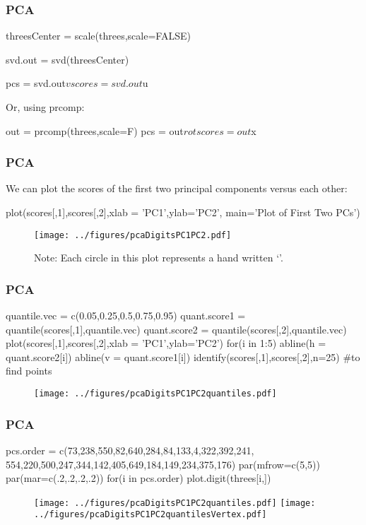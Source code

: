 \documentclass[12pt]{beamer}
\begin{document}
\begin{frame}[fragile]
\frametitle{PCA}
\begin{blockcode}
threesCenter = scale(threes,scale=FALSE)

svd.out = svd(threesCenter)

pcs    = svd.out$v
scores = svd.out$u%
\end{blockcode}
Or, using prcomp:
\begin{blockcode}
out = prcomp(threes,scale=F)
pcs = out$rot
scores = out$x
\end{blockcode}
\end{frame}

\begin{frame}[fragile]
\frametitle{PCA}
We can plot the scores of the first two principal components versus each other:
\begin{blockcode}
plot(scores[,1],scores[,2],xlab = 'PC1',ylab='PC2',
    main='Plot of First Two PCs')
\end{blockcode}

\begin{figure}
\centering
\texttt{[image: ../figures/pcaDigitsPC1PC2.pdf]}
\caption*{Note: Each circle in this plot represents a hand written `'.}
\end{figure}
\end{frame}

\begin{frame}[fragile]
\frametitle{PCA}
\begin{blockcode}
quantile.vec = c(0.05,0.25,0.5,0.75,0.95)
quant.score1 = quantile(scores[,1],quantile.vec)
quant.score2 = quantile(scores[,2],quantile.vec)
plot(scores[,1],scores[,2],xlab = 'PC1',ylab='PC2')
for(i in 1:5){
  abline(h = quant.score2[i])
  abline(v = quant.score1[i])
}
identify(scores[,1],scores[,2],n=25) #to find points
\end{blockcode}
\begin{figure}
\centering
\texttt{[image: ../figures/pcaDigitsPC1PC2quantiles.pdf]}
\end{figure}
\end{frame}

\begin{frame}[fragile]
\frametitle{PCA}
\begin{blockcode}
pcs.order = c(73,238,550,82,640,284,84,133,4,322,392,241,
    554,220,500,247,344,142,405,649,184,149,234,375,176)
par(mfrow=c(5,5))
par(mar=c(.2,.2,.2,.2))
for(i in pcs.order){
  plot.digit(threes[i,])
}
\end{blockcode}
\begin{figure}
\centering
\texttt{[image: ../figures/pcaDigitsPC1PC2quantiles.pdf]}
\texttt{[image: ../figures/pcaDigitsPC1PC2quantilesVertex.pdf]}
\end{figure}
\end{frame}
\end{document}
